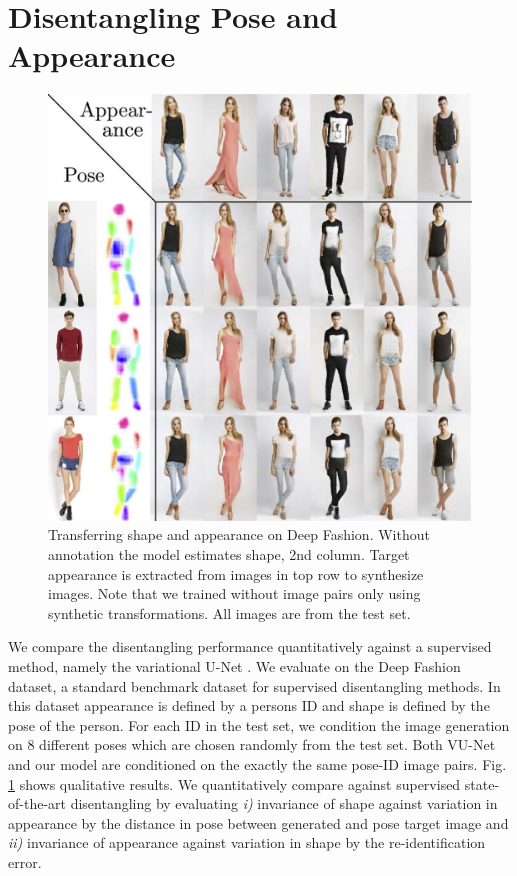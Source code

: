 \section{Disentangling Pose and Appearance}\label{sec:poseandappearance}
		\begin{figure}[htp]
			\centering
			\includegraphics[trim={0cm 0cm 0cm 0cm},clip, width=.5\linewidth]{fig/factor/swappy}
			\caption{Transferring shape and appearance on Deep Fashion. Without annotation the model estimates shape, 2nd column. Target appearance is extracted from images in top row to synthesize images. Note that we trained without image pairs only using synthetic transformations.
			All images are from the test set.}
			\label{fig:allswaps}
		\end{figure}

		We compare the disentangling performance quantitatively against a supervised method, namely the variational U-Net \cite{esser18}. We evaluate on the Deep Fashion \cite{liu16deepfashion, liu16deepfashionwild} dataset, a standard benchmark dataset for supervised disentangling methods. In this dataset appearance is defined by a persons ID and shape is defined by the pose of the person. For each ID in the test set, we condition the image generation on 8 different poses which are chosen randomly from the test set. Both VU-Net and our model are conditioned on the exactly the same pose-ID image pairs. Fig. \ref{fig:allswaps} shows qualitative results.
		We quantitatively compare against supervised state-of-the-art disentangling \cite{esser18} by evaluating \emph{i)} invariance of shape against variation in appearance by the distance in pose between generated and pose target image and \emph{ii)} invariance of appearance against variation in shape by the re-identification error.

